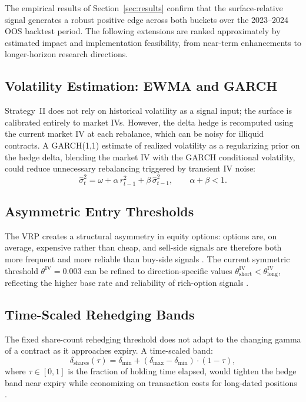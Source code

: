\documentclass[10pt,twocolumn]{article}
\begin{document}
The empirical results of Section~\ref{sec:results} confirm that the
surface-relative signal generates a robust positive edge across both
buckets over the 2023--2024 OOS backtest period. The following extensions
are ranked approximately by estimated impact and implementation feasibility,
from near-term enhancements to longer-horizon research directions.

\subsection{Volatility Estimation: EWMA and GARCH}

Strategy~II does not rely on historical volatility as a signal input; the
surface is calibrated entirely to market IVs. However, the delta hedge is
recomputed using the current market IV at each rebalance, which can be noisy
for illiquid contracts. A GARCH(1,1) estimate of realized volatility
\cite{bollerslev1986} as a regularizing prior on the hedge delta, blending
the market IV with the GARCH conditional volatility, could reduce
unnecessary rebalancing triggered by transient IV noise:
%
\begin{equation}
\hat{\sigma}_t^2 = \omega + \alpha\,r_{t-1}^2 + \beta\,\hat{\sigma}_{t-1}^2,
\qquad \alpha + \beta < 1.
\end{equation}

\subsection{Asymmetric Entry Thresholds}

The VRP creates a structural asymmetry in equity options: options are, on
average, expensive rather than cheap, and sell-side signals are therefore
both more frequent and more reliable than buy-side signals
\cite{carr2009, bollerslev2009}. The current symmetric threshold
$\theta^{\text{IV}} = 0.003$ can be refined to direction-specific values
$\theta_{\text{short}}^{\text{IV}} < \theta_{\text{long}}^{\text{IV}}$,
reflecting the higher base rate and reliability of rich-option signals
\cite{broadie2009}.

\subsection{Time-Scaled Rehedging Bands}

The fixed share-count rehedging threshold does not adapt to the changing
gamma of a contract as it approaches expiry. A time-scaled band:
%
\begin{equation}
\delta_{\text{shares}}(\tau) = \delta_{\min} +
(\delta_{\max} - \delta_{\min})\cdot(1 - \tau),
\end{equation}
%
where $\tau \in [0,1]$ is the fraction of holding time elapsed, would
tighten the hedge band near expiry while economizing on transaction costs
for long-dated positions \cite{whalley1997}.
\end{document}
